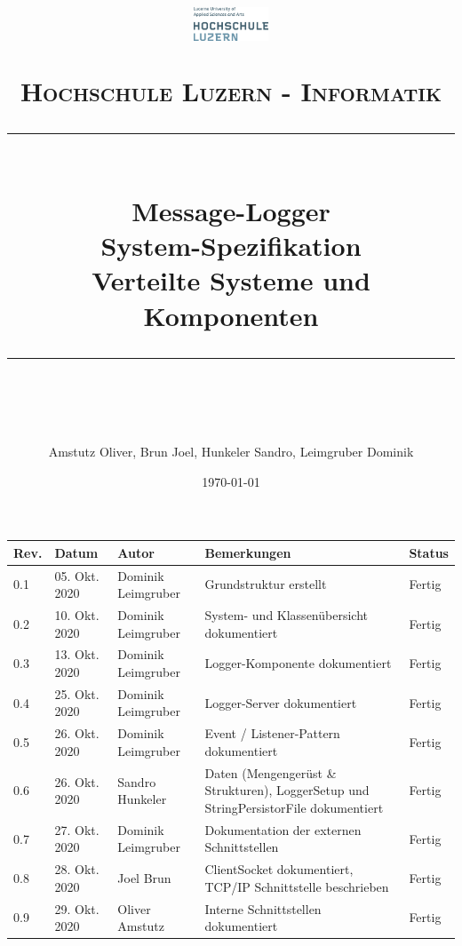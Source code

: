 \documentclass[11pt]{scrartcl} %
\title{	
	\begin{figure}[h]
		\begin{flushright}
			\includegraphics[width=0.2\textwidth]{Bilder/hsluLogo.eps}			
		\end{flushright}
	\end{figure}
	\vspace{10pt} %
	\normalfont\normalsize
	\textsc{Hochschule Luzern - Informatik}
	\vspace{12pt} %
	\rule{\linewidth}{0.5pt}\\ %
	{\huge Message-Logger}\\
	{\huge System-Spezifikation}\\ %
	\vspace{10pt} %
	{\large Verteilte Systeme und Komponenten }
	\vspace{12pt} %
	\rule{\linewidth}{2pt}\\ %
	\vspace{12pt} %
}
\author{\Large Amstutz Oliver, Brun Joel, Hunkeler Sandro, Leimgruber Dominik} %
\date{\normalsize\today} %
\begin{document}
\maketitle %
\pagestyle{fancy}
\thispagestyle{empty}
\setcounter{page}{0}
\newpage
\begin{center}
	\begin{tabularx}{\textwidth}{|l|l|l|X|l|}
		\hline
		\textbf{Rev.} & \textbf{Datum} & \textbf{Autor} & \textbf{Bemerkungen} & \textbf{Status}  \\ 
		\hline
		0.1 & 05. Okt. 2020 & Dominik Leimgruber & Grundstruktur erstellt & Fertig \\
		\hline
		0.2 & 10. Okt. 2020 & Dominik Leimgruber & System- und Klassenübersicht dokumentiert & Fertig \\
		\hline
		0.3 & 13. Okt. 2020 & Dominik Leimgruber & Logger-Komponente dokumentiert & Fertig \\
		\hline
		0.4 & 25. Okt. 2020 & Dominik Leimgruber & Logger-Server dokumentiert & Fertig \\
		\hline
		0.5 & 26. Okt. 2020 & Dominik Leimgruber & Event / Listener-Pattern dokumentiert & Fertig \\
		\hline
		0.6 & 26. Okt. 2020 & Sandro Hunkeler & Daten (Mengengerüst \& Strukturen), LoggerSetup und StringPersistorFile dokumentiert & Fertig \\
		\hline
		0.7 & 27. Okt. 2020 & Dominik Leimgruber & Dokumentation der externen Schnittstellen & Fertig \\
		\hline
		0.8 & 28. Okt. 2020 & Joel Brun & ClientSocket dokumentiert, TCP/IP Schnittstelle beschrieben & Fertig \\
		\hline
		0.9 & 29. Okt. 2020 & Oliver Amstutz & Interne Schnittstellen dokumentiert & Fertig \\
		\hline
	\end{tabularx}
\end{center}
\listoffigures
\listoftables
\newpage
\tableofcontents

\newpage








%

%
\end{document}

